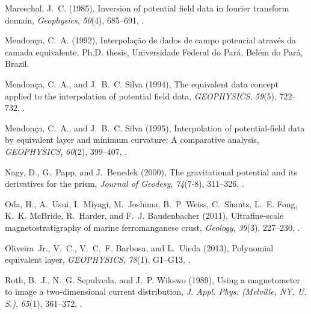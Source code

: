 \documentclass[galley,gc]{agutex}
\begin{document}
\begin{article}
\begin{thebibliography}{42}
Mareschal, J.~C. (1985), Inversion of potential field data in fourier transform
  domain, \textit{Geophysics}, \textit{50}(4), 685--691,
  .

Mendon\c{c}a, C.~A. (1992), Interpola\c{c}\~{a}o de dados de campo potencial
  atrav\'{e}s da camada equivalente, Ph.D. thesis, Universidade Federal do
  Par\'{a}, Bel\'{e}m do Par\'{a}, Brazil.

Mendon\c{c}a, C.~A., and J.~B.~C. Silva (1994), The equivalent data concept
  applied to the interpolation of potential field data, \textit{GEOPHYSICS},
  \textit{59}(5), 722--732, .

Mendon\c{c}a, C.~A., and J.~B.~C. Silva (1995), Interpolation of
  potential‐field data by equivalent layer and minimum curvature: A
  comparative analysis, \textit{GEOPHYSICS}, \textit{60}(2), 399--407,
  .

Nagy, D., G.~Papp, and J.~Benedek (2000), The gravitational potential and its
  derivatives for the prism, \textit{Journal of Geodesy}, \textit{74}(7-8),
  311--326, .

Oda, H., A.~Usui, I.~Miyagi, M.~Joshima, B.~P. Weiss, C.~Shantz, L.~E. Fong,
  K.~K. McBride, R.~Harder, and F.~J. Baudenbacher (2011), Ultrafine-scale
  magnetostratigraphy of marine ferromanganese crust, \textit{Geology},
  \textit{39}(3), 227--230, .

Oliveira~Jr., V.~C., V.~C.~F. Barbosa, and L.~Uieda (2013), Polynomial
  equivalent layer, \textit{GEOPHYSICS}, \textit{78}(1), G1--G13,
  .

Roth, B.~J., N.~G. Sepulveda, and J.~P. Wikswo (1989), Using a magnetometer to
  image a two-dimensional current distribution, \textit{J. Appl. Phys.
  (Melville, NY, U. S.)}, \textit{65}(1), 361--372, .


\end{thebibliography}
\end{article}
\end{document}
